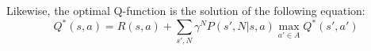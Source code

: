 Likewise, the optimal Q-function is the solution of the following equation:
\begin{equation}
    Q^*(s, a) = R(s, a) + \sum_{s', N} \gamma^N P(s', N|s, a) \max_{a' \in A} Q^*(s', a')
\end{equation}







